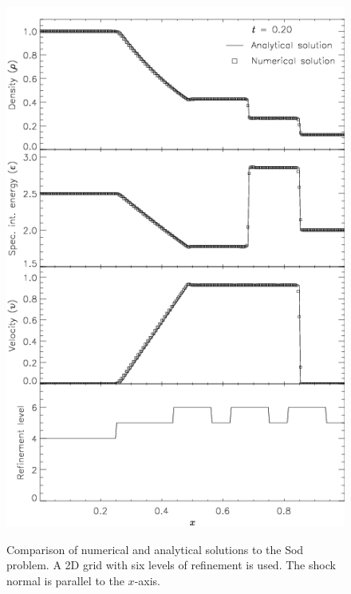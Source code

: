 \begin{figure}
\begin{center}
{\leavevmode\includegraphics[width=5in]{Sod_single}}
\end{center}
\caption{\label{Fig:Sod single} Comparison of numerical and analytical
solutions to the Sod problem. A 2D grid with six levels of refinement
is used. The shock normal is parallel to the $x$-axis.
}
\end{figure}
